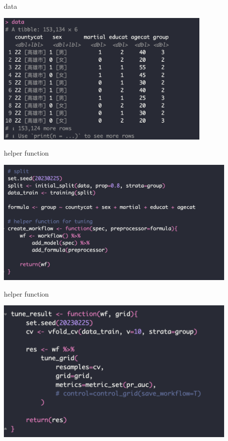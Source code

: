 \documentclass[
  ignorenonframetext,
]{beamer}
\begin{document}
\begin{frame}{data}
  \begin{center}
    \includegraphics[width=0.8\textwidth]{figure/pdf/code1.png}
  \end{center}
\end{frame}


\begin{frame}{helper function}
  \begin{center}
    \includegraphics[width=0.9\textwidth]{figure/pdf/code2.png}
  \end{center}
\end{frame}


\begin{frame}{helper function}
  \begin{center}
    \includegraphics[width=0.9\textwidth]{figure/pdf/code3.png}
  \end{center}
\end{frame}
\end{document}
